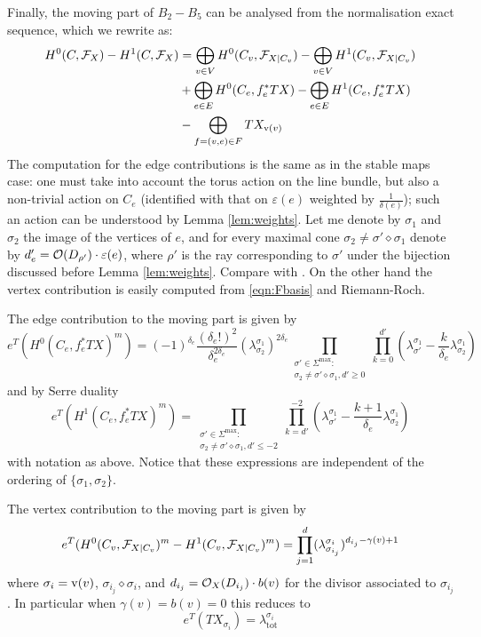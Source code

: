 Finally, the moving part of $B_2-B_5$ can be analysed from the normalisation exact sequence, which we rewrite as:
\begin{equation}\label{eqn:contrtoF}
\begin{aligned}
 H^0(C,\mathcal F_X)-H^1(C,\mathcal F_X) &= \bigoplus_{v\in V}H^0(C_v,\mathcal F_{X|C_v})-\bigoplus_{v\in V}H^1(C_v,\mathcal F_{X|C_v}) \\
 & + \bigoplus_{e\in E}H^0(C_e,f_e^*TX)-\bigoplus_{e\in E}H^1(C_e,f_e^*TX) \\
 & - \bigoplus_{f=(v,e)\in F} TX_{\operatorname{v}(v)}
\end{aligned} 
\end{equation}
The computation for the edge contributions is the same as in the stable maps case: one must take into account the torus action on the line bundle, but also a non-trivial action on $C_e$ (identified with that on $\varepsilon(e)$ weighted by $\frac{1}{\delta(e)}$); such an action can be understood by Lemma \ref{lem:weights}. Let me denote by $\sigma_1$ and $\sigma_2$ the image of the vertices of $e$, and for every maximal cone $\sigma_2\neq\sigma'\diamond\sigma_1$ denote by $d'_e=\mathcal{O}(D_{\rho'})\cdot \varepsilon(e)$, where $\rho'$ is the ray corresponding to $\sigma'$ under the bijection discussed before Lemma \ref{lem:weights}. Compare with \cite[Lemma 7.4 and Corollary 7.5]{HolgerSpielberg}. On the other hand the vertex contribution is easily computed from \eqref{eqn:Fbasis} and Riemann-Roch.
\begin{lem}
The edge contribution to the moving part is given by
\[
 e^T(H^0(C_e,f_e^*TX)^m)=(-1)^{\delta_e}\frac{(\delta_e!)^2}{\delta_e^{2\delta_e}}(\lambda^{\sigma_1}_{\sigma_2})^{2\delta_e}\prod_{\substack{\sigma'\in\Sigma^{\text{max}}: \\ \sigma_2\neq\sigma'\diamond\sigma_1,d'\geq0}}\prod_{k=0}^{d'}(\lambda^{\sigma_1}_{\sigma'}-\frac{k}{\delta_e}\lambda^{\sigma_1}_{\sigma_2})
\]
and by Serre duality
\[
 e^T(H^1(C_e,f_e^*TX)^m)=\prod_{\substack{\sigma'\in\Sigma^{\text{max}}: \\ \sigma_2\neq\sigma'\diamond\sigma_1,d'\leq -2}}\prod_{k=d'}^{-2}(\lambda^{\sigma_1}_{\sigma'}-\frac{k+1}{\delta_e}\lambda^{\sigma_1}_{\sigma_2})
\]
with notation as above. Notice that these expressions are independent of the ordering of $\{\sigma_1,\sigma_2\}$.
\end{lem}

\begin{lem}
 The vertex contribution to the moving part is given by
 \[
  e^T(H^0(C_v,\mathcal F_{X|C_v})^m-H^1(C_v,\mathcal F_{X|C_v})^m)=\prod_{j=1}^d(\lambda^{\sigma_i}_{\sigma_{i_j}})^{d_{i_j}-\gamma(v)+1}
 \]
\noindent where $\sigma_i=\operatorname{v}(v)$, $\sigma_{i_j}\diamond\sigma_i$, and $d_{i_j}=\mathcal{O}_X(D_{i_j})\cdot b(v)$ for the divisor associated to $\sigma_{i_j}$. In particular when $\gamma(v)=b(v)=0$ this reduces to
\[
 e^T(TX_{\sigma_i})=\lambda^{\sigma_i}_{\text{tot}}
\]

\end{lem}

